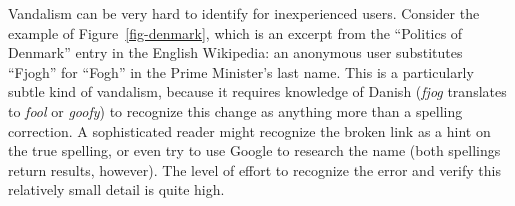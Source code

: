 Vandalism can be very hard to identify for inexperienced users.
Consider the example of Figure~\ref{fig-denmark},
which is an excerpt from the ``Politics of Denmark''
entry in the English Wikipedia: an anonymous user substitutes
``Fjogh'' for ``Fogh'' in the Prime Minister's last name.
This is a particularly subtle kind of vandalism,
because it requires knowledge of Danish
(\textit{fjog} translates to \textit{fool} or \textit{goofy})
to recognize this change as anything more than a spelling correction.
A sophisticated reader might recognize the broken link
as a hint on the true spelling, or even try to use Google
to research the name (both spellings return results, however).
The level of effort to recognize the error and
verify this relatively small detail is quite high.

